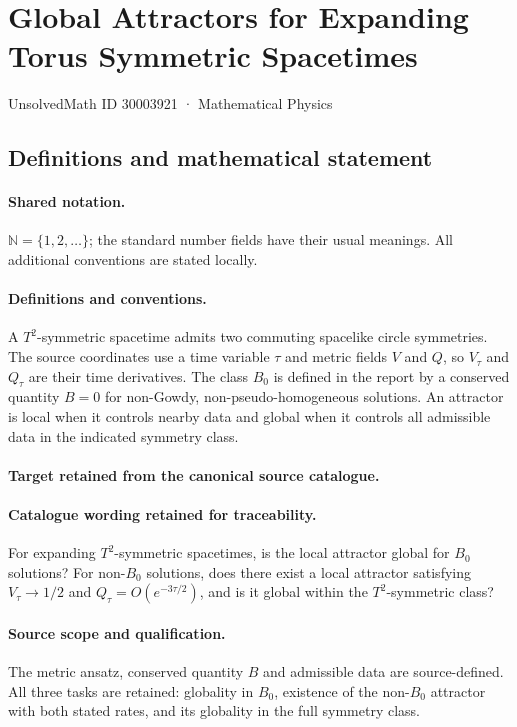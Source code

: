 \documentclass[11pt]{article}
\begin{document}
\setcounter{section}{30003920}
\section{Global Attractors for Expanding Torus Symmetric Spacetimes}\label{30003921}
{\small UnsolvedMath ID 30003921 · Mathematical Physics}
\subsection{Definitions and mathematical statement}

\paragraph{Shared notation.}$\mathbb N=\{1,2,\ldots\}$; the standard number fields have their usual meanings. All additional conventions are stated locally.


\paragraph{Definitions and conventions.}
A $T^2$-symmetric spacetime admits two commuting spacelike circle symmetries. The source coordinates use a time variable $\tau$ and metric fields $V$ and $Q$, so $V_\tau$ and $Q_\tau$ are their time derivatives. The class $B_0$ is defined in the report by a conserved quantity $B=0$ for non-Gowdy, non-pseudo-homogeneous solutions. An attractor is local when it controls nearby data and global when it controls all admissible data in the indicated symmetry class.

\paragraph{Target retained from the canonical source catalogue.}
\paragraph{Catalogue wording retained for traceability.}
For expanding $T^2$-symmetric spacetimes, is the local attractor global for $B_0$ solutions? For non-$B_0$ solutions, does there exist a local attractor satisfying $V_\tau\to1/2$ and $Q_\tau=O(e^{-3\tau/2})$, and is it global within the $T^2$-symmetric class?

\paragraph{Source scope and qualification.}
The metric ansatz, conserved quantity $B$ and admissible data are source-defined. All three tasks are retained: globality in $B_0$, existence of the non-$B_0$ attractor with both stated rates, and its globality in the full symmetry class.
\end{document}
